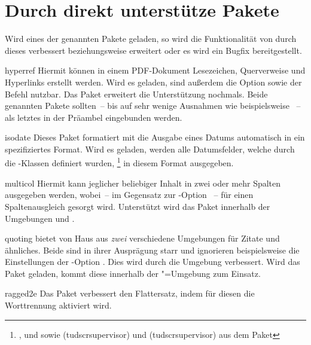 \section{Durch \TUDScript direkt unterstütze Pakete}
%
Wird eines der genannten Pakete geladen, so wird die Funktionalität von 
\TUDScript durch dieses verbessert beziehungsweise erweitert oder es wird ein 
Bugfix bereitgestellt.
%
\begin{packages}
\item[hyperref]
  Hiermit können in einem PDF-Dokument Lesezeichen, Querverweise und 
  Hyperlinks erstellt werden. Wird es geladen, sind außerdem die Option 
   sowie der Befehl  nutzbar. Das 
  Paket  erweitert die Unterstützung nochmals. Beide 
  genannten Pakete sollten~-- bis auf sehr wenige Ausnahmen wie beispielsweise 
  ~-- als letztes in der Präambel eingebunden werden.
\item[isodate]
  Dieses Paket formatiert mit  die Ausgabe 
  eines Datums automatisch in ein spezifiziertes Format. Wird es geladen, 
  werden alle Datumsfelder, welche durch die \TUDScript-Klassen definiert 
  wurden,%
  \footnote{%
    ,  und  sowie 
    (tudscrsupervisor) und (tudscrsupervisor) 
    aus dem Paket 
  }
  in diesem Format ausgegeben.
\item[multicol]
  Hiermit kann jeglicher beliebiger Inhalt in zwei oder mehr Spalten ausgegeben 
  werden, wobei~-- im Gegensatz zur \KOMAScript-Option ~-- 
  für einen Spaltenausgleich gesorgt wird. Unterstützt wird das Paket innerhalb 
  der Umgebungen  und .
\item[quoting]
   bietet von Haus aus \emph{zwei} verschiedene Umgebungen für 
  Zitate und ähnliches. Beide sind in ihrer Ausprägung starr und ignorieren 
  beispielsweise die Einstellungen der \KOMAScript-Option . 
  Dies wird durch die Umgebung  verbessert. Wird das Paket 
  geladen, kommt diese innerhalb der "=Umgebung zum 
  Einsatz.
\item[ragged2e]
  Das Paket verbessert den Flattersatz, indem für diesen die Worttrennung 
  aktiviert wird.
\end{packages}



